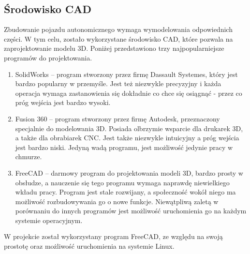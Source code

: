     \subsection{Środowisko CAD}
        Zbudowanie pojazdu autonomicznego wymaga wymodelowania odpowiednich części.
        W tym celu, zostało wykorzystane środowisko CAD, które pozwala na zaprojektowanie modelu 3D.
        Poniżej przedstawiono trzy najpopularniejsze programów do projektowania.
        \begin{enumerate}
            \item SolidWorks -- program stworzony przez firmę Dassault Systemes, który jest bardzo popularny w przemyśle. Jest też niezwykle precyzyjny i każda operacja wymaga zastanowienia się dokładnie co chce się osiągnąć - przez co próg wejścia jest bardzo wysoki.
            \item Fusion 360 -- program stworzony przez firmę Autodesk, przeznaczony specjalnie do modelowania 3D. Posiada olbrzymie wsparcie dla drukarek 3D, a także dla obrabiarek CNC.
                                Jest także niezwykle intuicyjny a próg wejścia jest bardzo niski. Jedyną wadą programu, jest możliwość jedynie pracy w chmurze.
            \item FreeCAD -- darmowy program do projektowania modeli 3D, bardzo prosty w obsłudze, a nauczenie się tego programu wymaga naprawdę niewielkiego wkładu pracy.
                             Program jest stale rozwijany, a społeczność wokół niego ma możliwość rozbudowywania go o nowe funkcje. Niewątpliwą zaletą w porównaniu do innych programów jest możliwość uruchomienia go na każdym systemie operacyjnym.
        \end{enumerate}

        W projekcie został wykorzystany program FreeCAD, ze względu na swoją prostotę oraz możliwość uruchomienia na systemie Linux.

